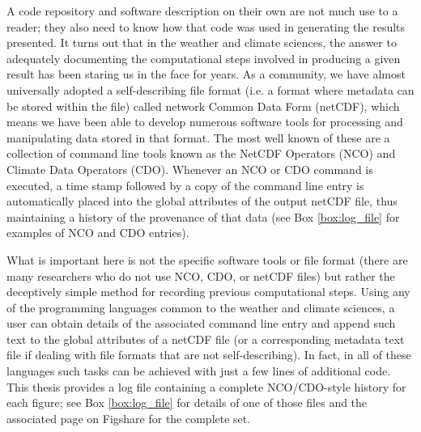 A code repository and software description on their own are not much use to a reader; they also need to know how that code was used in generating the results presented. It turns out that in the weather and climate sciences, the answer to adequately documenting the computational steps involved in producing a given result has been staring us in the face for years. As a community, we have almost universally adopted a self-describing file format (i.e. a format where metadata can be stored within the file) called network Common Data Form (netCDF), which means we have been able to develop numerous software tools for processing and manipulating data stored in that format. The most well known of these are a collection of command line tools known as the NetCDF Operators (NCO) and Climate Data Operators (CDO). Whenever an NCO or CDO command is executed, a time stamp followed by a copy of the command line entry is automatically placed into the global attributes of the output netCDF file, thus maintaining a history of the provenance of that data (see Box \ref{box:log_file} for examples of NCO and CDO entries).

What is important here is not the specific software tools or file format (there are many researchers who do not use NCO, CDO, or netCDF files) but rather the deceptively simple method for recording previous computational steps. Using any of the programming languages common to the weather and climate sciences, a user can obtain details of the associated command line entry and append such text to the global attributes of a netCDF file (or a corresponding metadata text file if dealing with file formats that are not self-describing). In fact, in all of these languages such tasks can be achieved with just a few lines of additional code. This thesis provides a log file containing a complete NCO/CDO-style history for each figure; see Box \ref{box:log_file} for details of one of those files and the associated page on Figshare \citep{IrvingFigshare2016} for the complete set.

